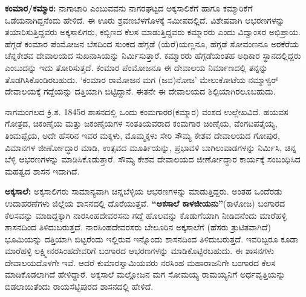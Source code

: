 \textbf{ಕಂಮಾರ/ಕಮ್ಮಾರ:} ನಾಗಾಚಾರಿ ಎಂಬುವವನು ನಾಗರಘಟ್ಟದ ಅಕ್ಕಸಾಲಿಕೆಗೆ ಹಾಗೂ ಕಮ್ಮಾರಿಕೆಗೆ ಒಡೆಯನಾಗಿದ್ದ\-ನೆಂದು ಹೇಳಿದೆ. ಈ ಊರು ಶ್ರವಣಬೆಳಗೊಳಕ್ಕೆ ಸಮೀಪದಲ್ಲಿದೆ. ವಿಶೇಷವಾಗಿ ಆಭರಣಗಳನ್ನು ತಯಾರಿಸುತ್ತಿದ್ದವರು ಅಕ್ಕಸಾಲಿಗರು, ಕಬ್ಬಿಣದ ಕೆಲಸ ಮಾಡುತ್ತಿದ್ದವರು ಕಮ್ಮಾರರು ಎಂದು ವಿದ್ವಾಂಸರ ಅಭಿಪ್ರಾಯ. ಹೆಗ್ಗಡೆ ಕಂಮಾರ ಪೆಂಮೋಜನ ಬೆಸದಿಂದ ಸುಂಕದ ಹೆಗ್ಗಡೆ (ಯೆರೆ)ಯಣ್ಣನೂ, ಹೆಗ್ಗಡೆ ಸೋವಂಣನೂ ಅರಕೆರೆಯ ಚೆನ್ನಕೇಶವ ದೇವಾಲಯದ ಸುಖನಾಸಿಯನ್ನು ನಿರ್ಮಿಸುತ್ತಾರೆ. ಕಮ್ಮಾರರು ಹೆಗ್ಗಡೆಯಂತಹ ಅಧಿಕಾರ ಸ್ಥಾನದಲ್ಲಿದ್ದರು ಎಂಬುದನ್ನು ಇದು ತೋರಿಸುತ್ತದೆ. ಕಂಮಾರ ಪೆಂಮೋಜನೂ ಈ ದೇವಾಲಯ ನಿರ್ಮಾಣದಲ್ಲಿ ತನ್ನನ್ನು ತೊಡಗಿಸಿಕೊಂಡಿರಬಹುದು. ‘ಕಂಮಾರ ರಾಮೋಜನ ಮಗ (ಜವ)ನೋಜ’ ಮೇಲುಕೋಟೆಯ ನಮ್ಮಾಳ್ವರ್​ ದೇವಾಲಯಕ್ಕೆ ಗದ್ದೆಯನ್ನು ದತ್ತಿಯಾಗಿ ಬಿಟ್ಟಿದ್ದಾನೆ. ಈತನೇ ಈ ದೇವಾಲಯದ ಶಿಲ್ಪಿಯಾಗಿರಲೂ\-ಬಹುದು.

ನಾಗಮಂಗಲದ ಕ್ರಿ.ಶ. 1845ರ ಶಾಸನದಲ್ಲಿ ಒಂದು ಕಂಮಗಾರರ(ಕಮ್ಮಾರ) ವಂಶದ ಉಲ್ಲೇಖವಿದೆ. ಹಯವಸ ಗೋತ್ರದ, ಚಿಕಂಣೈಯ ಮತ್ತು ಜಕಂಣೈಯಗಳ ಸಂತತಿಯವರಾದ ಕಂಮಗಾರ ಚಿಂಣೈಯ, ವೆಂಗಟಪತೈಯ್ಯ, ತಿಂಮಪ್ಪೈಯ, ಅದೇ ಹೆಸರಿನ ಇವರ ಮಕ್ಕಳು, ಮೊಮ್ಮಕ್ಕಳು ಸೇರಿ ಸೌಮ್ಯ ಕೇಶವ ದೇವಾಲಯದ ಗೋಪುರ, ವಿಮಾನಗಳ ಜೀರ್ಣೋದ್ಧಾರ ಮಾಡಿ, ಉತ್ಸವದ ಮೂರ್ತಿಯನ್ನು, ಪ್ರಭಾವಳಿ ಬಾಗಿಲುವಾಡಗಳನ್ನು ನಿರ್ಮಿಸಿ, ಚಿನ್ನ ಬೆಳ್ಳಿ ಆಭರಣಗಳನ್ನು ಮಾಡಿಸಿಕೊಡುತ್ತಾರೆ. ಸೌಮ್ಯ ಕೇಶವ ದೇವಾಲಯದ ಜೀರ್ಣೋದ್ಧಾರ ಕಾರ್ಯಕ್ಕೆ ಸಂಬಂಧಿಸಿದ ಮಹತ್ವದ ಶಾಸನ ಇದಾಗಿದೆ.

\textbf{ಅಕ್ಕಸಾಲೆ:} ಅಕ್ಕಸಾಲಿಗರು ಸಾಮಾನ್ಯವಾಗಿ ಚಿನ್ನಬೆಳ್ಳಿಯ ಆಭರಣಗಳನ್ನು ಮಾಡುತ್ತಿದ್ದರು. ಅಂತಹ ಒಂದೆರಡು ಉದಾಹರಣೆಗಳು ಜಿಲ್ಲೆಯ ಶಾಸನದಲ್ಲಿ ದೊರೆಯುತ್ತವೆ. \textbf{“ಅಕಸಾಲೆ ಕಾಳಜೀಯನು”}(ಕಾಳೋಜ) ಬಂಗಾರದ ಕೆಲಸವನ್ನು ಮಾಡಿದ್ದಕ್ಕಾಗಿ ನಾರಸಿಂಹದೇವರಸನು ಗದ್ದೆ ಹೊಲವನ್ನು ಕೊಡುಗೆಯಾಗಿ ನೀಡಿದನೆಂದು ಮಾರೆಹಳ್ಳಿ ಶಾಸನದಿಂದ ತಿಳಿದು\-ಬರುತ್ತದೆ. ನಾರಸಿಂಹದೇವರಸರು ಬೇಲೂರಿನ ಅಕ್ಕಸಾಲೆಗೆ (ಹೆಸರು ತ್ರುಟಿತವಾಗಿದೆ) ಭೂಮಿಯನ್ನು ದತ್ತಿಯಾಗಿ ಬಿಟ್ಟರೆಂದು ಇಲ್ಲಿರುವ ಇನ್ನೊಂದು ಶಾಸನದಿಂದ ತಿಳಿದು\-ಬರುತ್ತದೆ. ಇವರಿಬ್ಬರೂ ಕೂಡಾ ಮಾರೆಹಳ್ಳಿ ಲಕ್ಷ್ಮೀನರಸಿಂಹದೇವರಿಗೆ ಬಂಗಾರದ ಆಭರಣಗಳನ್ನು ಮಾಡಿಕೊಟ್ಟಿರಬಹುದು. ಈ ಶಾಸನಗಳು ದೇವಾಲಯದೊಳಗೇ ಇವೆ. ಆದರೆ ಕುಮಾರಸ್ವಾಮಿ\-ಯವರು ನರಸಿಂಹ ಮಹಾರಾಜನಿಗೇ ಬಂಗಾರದ ಕೆಲಸ ಮಾಡಿಕೊಡಲಾಗಿದೆ ಹೇಳಿದ್ದಾರೆ. ಅಕ್ಕಸಾಲೆ ಮಲ್ಲೋಜನ ಮಗ ಸೋಮಯ್ಯ ರಾಮಯ್ಯನಿಗೆ ಅರ್ಧವೃತ್ತಿಯನ್ನು ಬಿಡಲಾಯಿತೆಂದು ರಾಯಸೆಟ್ಟಿಪುರದ ಶಾಸನದಲ್ಲಿ ಹೇಳಿದೆ.

